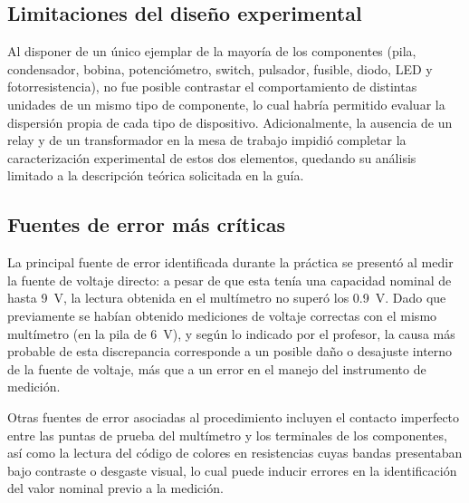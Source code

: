 \subsection{Limitaciones del diseño experimental}

Al disponer de un único ejemplar de la mayoría de los componentes (pila, condensador, bobina, potenciómetro, switch, pulsador, fusible, diodo, LED y fotorresistencia), no fue posible contrastar el comportamiento de distintas unidades de un mismo tipo de componente, lo cual habría permitido evaluar la dispersión propia de cada tipo de dispositivo. Adicionalmente, la ausencia de un relay y de un transformador en la mesa de trabajo impidió completar la caracterización experimental de estos dos elementos, quedando su análisis limitado a la descripción teórica solicitada en la guía.

\subsection{Fuentes de error más críticas}

La principal fuente de error identificada durante la práctica se presentó al medir la fuente de voltaje directo: a pesar de que esta tenía una capacidad nominal de hasta 9~V, la lectura obtenida en el multímetro no superó los 0.9~V. Dado que previamente se habían obtenido mediciones de voltaje correctas con el mismo multímetro (en la pila de 6~V), y según lo indicado por el profesor, la causa más probable de esta discrepancia corresponde a un posible daño o desajuste interno de la fuente de voltaje, más que a un error en el manejo del instrumento de medición.

Otras fuentes de error asociadas al procedimiento incluyen el contacto imperfecto entre las puntas de prueba del multímetro y los terminales de los componentes, así como la lectura del código de colores en resistencias cuyas bandas presentaban bajo contraste o desgaste visual, lo cual puede inducir errores en la identificación del valor nominal previo a la medición.